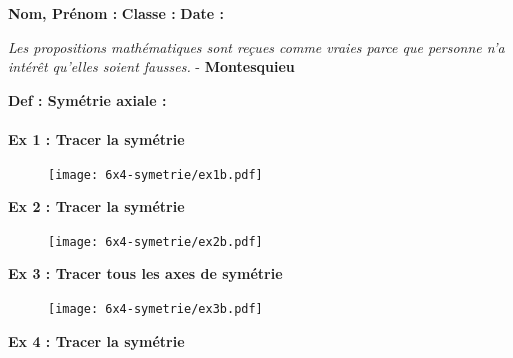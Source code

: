 



\textbf{Nom, Prénom :} \hspace{8cm} \textbf{Classe :} \hspace{3cm} \textbf{Date :}\\

\begin{center}
  \textit{Les propositions mathématiques sont reçues comme vraies parce que personne n’a intérêt qu’elles soient fausses.} - \textbf{Montesquieu}
\end{center}

\textbf{Def : Symétrie axiale : } \dotfill \\ \Pointilles[2] \\

\textbf{Ex 1 : Tracer la symétrie}

\begin{figure}[H]
  \centering
  \texttt{[image: 6x4-symetrie/ex1b.pdf]}
\end{figure}

\begin{multicols}{2} 
\textbf{Ex 2 : Tracer la symétrie}

\begin{figure}[H]
  \centering
  \texttt{[image: 6x4-symetrie/ex2b.pdf]}
\end{figure}

\textbf{Ex 3 : Tracer tous les axes de symétrie}

\begin{figure}[H]
  \centering
  \texttt{[image: 6x4-symetrie/ex3b.pdf]}
\end{figure}
\end{multicols}

\textbf{Ex 4 : Tracer la symétrie}

